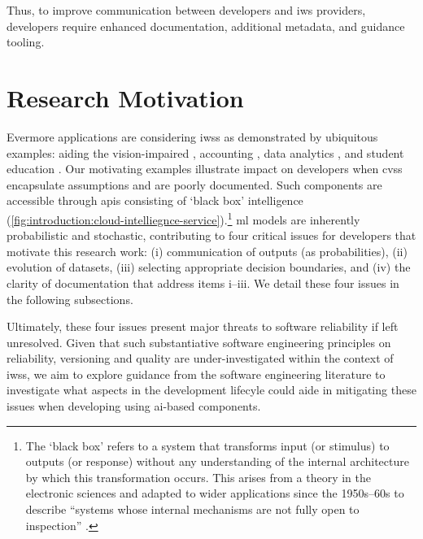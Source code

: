 Thus, to improve communication between developers and \gls{iws} providers, developers require enhanced documentation, additional metadata, and guidance tooling. 

\section{Research Motivation}%
\label{sec:introduction:motivation}

Evermore applications are considering \glspl{iws} as demonstrated by ubiquitous examples: aiding the vision-impaired \citep{Reis:2018cp,daMotaSilveira:2017vp}, accounting  \citep{Marshall:2018uj}, data analytics \citep{Iyengar:2017fb}, and student education \citep{Dibia:2017iy}.
Our motivating examples illustrate impact on developers when \glspl{cvs} encapsulate assumptions and are poorly documented. Such components are accessible through \glspl{api} consisting of `black box' intelligence (\cref{fig:introduction:cloud-intelliegnce-service}).\footnote{The `black box' refers to a system that transforms input (or stimulus)  to outputs (or response) without any understanding of the internal architecture by which this transformation occurs. This arises from a theory in the electronic sciences and adapted to wider applications since the 1950s--60s \citep{Ashby:1957db,Bunge:1963jm} to describe ``systems whose internal mechanisms are not fully open to inspection'' \citep{Ashby:1957db}. }
\gls{ml} models are inherently probabilistic and stochastic, contributing to four critical issues for developers that motivate this research work: (i) communication of outputs (as probabilities), (ii) evolution of datasets, (iii) selecting appropriate decision boundaries, and (iv) the clarity of documentation that address items i--iii. We detail these four issues in the following subsections.

Ultimately, these four issues present major threats to software reliability if left unresolved. Given that such substantiative software engineering principles on reliability, versioning and quality  are under-investigated within the context of \glspl{iws}, we aim to explore guidance from the software engineering literature to investigate what aspects in the development lifecyle could aide in mitigating these issues when developing using \gls{ai}-based components.

